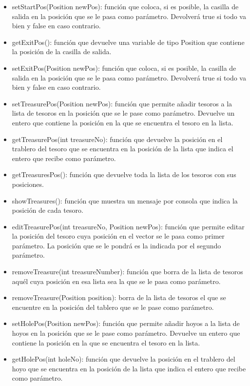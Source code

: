 \documentclass[a4paper,12pt,twoside,openright]{report}
\begin{document}
\begin{itemize}
   \item setStartPos(Position newPos): función que coloca, si es posible, la casilla de salida en la posición que se le pasa como parámetro. 
   Devolverá true si todo va bien y false en caso contrario.
   \item getExitPos(): función que devuelve una variable de tipo Position que contiene la posición de la casilla de salida.
   \item setExitPos(Position newPos): función que coloca, si es posible, la casilla de salida en la posición que se le pasa como parámetro. 
   Devolverá true si todo va bien y false en caso contrario.
   \item setTreasurePos(Position newPos): función que permite añadir tesoros a la lista de tesoros en la posición que se le pase como parámetro.
   Devuelve un entero que contiene la posición en la que se encuentra el tesoro en la lista.
   \item getTreasurePos(int treasureNo): función que devuelve la posición en el trablero del tesoro que se encuentra 
   en la posición de la lista que indica el entero que recibe como parámetro. 
   \item getTreasuresPos(): función que devuelve toda la lista de los tesoros con sus posiciones.
   \item showTreasures(): función que muestra un mensaje por consola que indica la posición de cada tesoro.
   \item editTreasurePos(int treasureNo, Position newPos): función que permite editar la posición del tesoro cuya posición en el vector se le pasa 
   como primer parámetro. La posición que se le pondrá es la indicada por el segundo parámetro.
   \item removeTreasure(int treasureNumber): función que borra de la lista de tesoros aquél cuya posición en esa lista sea la que 
   se le pasa como parámetro.
   \item removeTreasure(Position position): borra de la lista de tesoros el que se encuentre en la posición del tablero que se le pase 
   como parámetro.
   \item setHolePos(Position newPos): función que permite añadir hoyos a la lista de hoyos en la posición que se le pase como parámetro.
   Devuelve un entero que contiene la posición en la que se encuentra el tesoro en la lista.
   \item getHolePos(int holeNo): función que devuelve la posición en el trablero del hoyo que se encuentra 
   en la posición de la lista que indica el entero que recibe como parámetro. 

\end{itemize}
\end{document}
